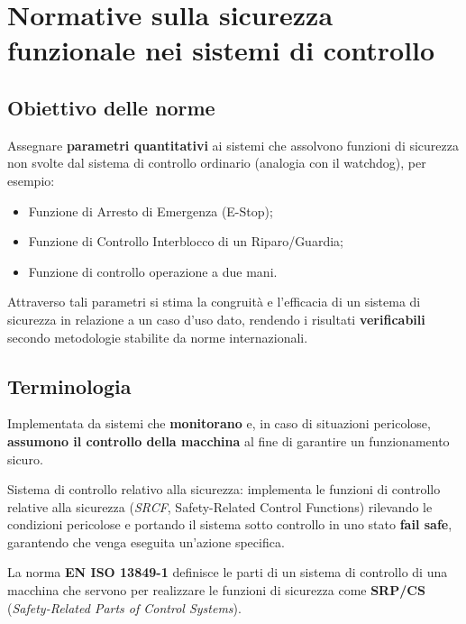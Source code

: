 \chapter{Normative sulla sicurezza funzionale nei sistemi di controllo}
\label{cap:normative}

\section{Obiettivo delle norme}
Assegnare \textbf{parametri quantitativi} ai sistemi che assolvono funzioni di sicurezza non svolte dal sistema di controllo ordinario (analogia con il watchdog), per esempio:
\begin{itemize}
    \item Funzione di Arresto di Emergenza (E-Stop);
    \item Funzione di Controllo Interblocco di un Riparo/Guardia;
    \item Funzione di controllo operazione a due mani.
\end{itemize}
Attraverso tali parametri si stima la congruità e l'efficacia di un sistema di sicurezza in relazione a un caso d'uso dato, rendendo i risultati \textbf{verificabili} secondo metodologie stabilite da norme internazionali.

\section{Terminologia}
\begin{defn}
Implementata da sistemi che \textbf{monitorano} e, in caso di situazioni pericolose, \textbf{assumono il controllo della macchina} al fine di garantire un funzionamento sicuro.
\end{defn}

\begin{defn}
Sistema di controllo relativo alla sicurezza: implementa le funzioni di controllo relative alla sicurezza (\emph{SRCF}, Safety-Related Control Functions) rilevando le condizioni pericolose e portando il sistema sotto controllo in uno stato \textbf{fail safe}, garantendo che venga eseguita un'azione specifica.
\end{defn}

La norma \textbf{EN ISO 13849-1} definisce le parti di un sistema di controllo di una macchina che servono per realizzare le funzioni di sicurezza come \textbf{SRP/CS} (\emph{Safety-Related Parts of Control Systems}).

